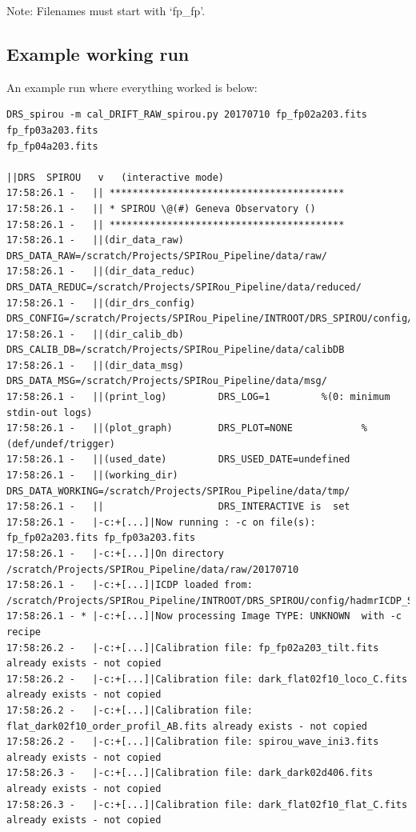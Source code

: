 Note: Filenames must start with `fp\_fp'.

\subsection{Example working run}

An example run where everything worked is below:

\begin{lstlisting}[style=text]
DRS_spirou -m cal_DRIFT_RAW_spirou.py 20170710 fp_fp02a203.fits fp_fp03a203.fits
fp_fp04a203.fits

||DRS  SPIROU   v   (interactive mode)
17:58:26.1 -   || *****************************************
17:58:26.1 -   || * SPIROU \@(#) Geneva Observatory ()
17:58:26.1 -   || *****************************************
17:58:26.1 -   ||(dir_data_raw)      DRS_DATA_RAW=/scratch/Projects/SPIRou_Pipeline/data/raw/
17:58:26.1 -   ||(dir_data_reduc)    DRS_DATA_REDUC=/scratch/Projects/SPIRou_Pipeline/data/reduced/
17:58:26.1 -   ||(dir_drs_config)    DRS_CONFIG=/scratch/Projects/SPIRou_Pipeline/INTROOT/DRS_SPIROU/config/
17:58:26.1 -   ||(dir_calib_db)      DRS_CALIB_DB=/scratch/Projects/SPIRou_Pipeline/data/calibDB
17:58:26.1 -   ||(dir_data_msg)      DRS_DATA_MSG=/scratch/Projects/SPIRou_Pipeline/data/msg/
17:58:26.1 -   ||(print_log)         DRS_LOG=1         %(0: minimum stdin-out logs)
17:58:26.1 -   ||(plot_graph)        DRS_PLOT=NONE            %(def/undef/trigger)
17:58:26.1 -   ||(used_date)         DRS_USED_DATE=undefined
17:58:26.1 -   ||(working_dir)       DRS_DATA_WORKING=/scratch/Projects/SPIRou_Pipeline/data/tmp/
17:58:26.1 -   ||                    DRS_INTERACTIVE is  set
17:58:26.1 -   |-c:+[...]|Now running : -c on file(s):  fp_fp02a203.fits fp_fp03a203.fits
17:58:26.1 -   |-c:+[...]|On directory /scratch/Projects/SPIRou_Pipeline/data/raw/20170710
17:58:26.1 -   |-c:+[...]|ICDP loaded from: /scratch/Projects/SPIRou_Pipeline/INTROOT/DRS_SPIROU/config/hadmrICDP_SPIROU.py
17:58:26.1 - * |-c:+[...]|Now processing Image TYPE: UNKNOWN  with -c recipe
17:58:26.2 -   |-c:+[...]|Calibration file: fp_fp02a203_tilt.fits already exists - not copied
17:58:26.2 -   |-c:+[...]|Calibration file: dark_flat02f10_loco_C.fits already exists - not copied
17:58:26.2 -   |-c:+[...]|Calibration file: flat_dark02f10_order_profil_AB.fits already exists - not copied
17:58:26.2 -   |-c:+[...]|Calibration file: spirou_wave_ini3.fits already exists - not copied
17:58:26.3 -   |-c:+[...]|Calibration file: dark_dark02d406.fits already exists - not copied
17:58:26.3 -   |-c:+[...]|Calibration file: dark_flat02f10_flat_C.fits already exists - not copied

\end{lstlisting}
